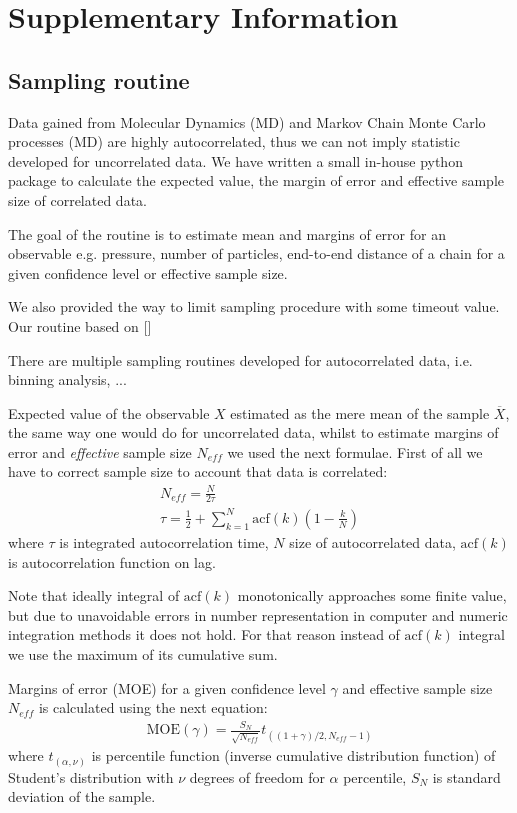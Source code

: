 \newpage
\section*{Supplementary Information}
\subsection{Sampling routine}
Data gained from Molecular Dynamics (MD) and Markov Chain Monte Carlo processes (MD) are highly autocorrelated, thus we can not imply statistic developed for uncorrelated data. We have written a small in-house python package to calculate the expected value, the margin of error and effective sample size of correlated data.

The goal of the routine is to estimate mean and margins of error for an observable e.g. pressure, number of particles, end-to-end distance of a chain for a given confidence level or effective sample size. 

We also provided the way to limit sampling procedure with some timeout value. Our routine based on [] %

There are multiple sampling routines developed for autocorrelated data, i.e. binning analysis, ... %

Expected value of the observable $X$ estimated as the mere mean of the sample $\overline{X}$, the same way one would do for uncorrelated data, whilst to estimate margins of error and \emph{effective} sample size $N_{eff}$ we used the next formulae. 
First of all we have to correct sample size to account that data is correlated:
\begin{eqnarray}
    N_{eff} = \frac{N}{2\tau}
    \\
    \tau  = \frac{1}{2} + \sum_{k=1}^{N} \text{acf} (k) (1-\frac{k}{N})
\end{eqnarray}
where $\tau$ is integrated autocorrelation time, $N$ size of autocorrelated data, $\text{acf} (k)$ is autocorrelation function on lag.

Note that ideally integral of  $\text{acf} (k)$ monotonically approaches some finite value, but due to unavoidable errors in number representation in computer and numeric integration methods it does not hold. 
For that reason instead of $\text{acf} (k)$ integral we use the maximum of its cumulative sum.

Margins of error (MOE) for a given confidence level $\gamma$ and effective sample size $N_{eff}$ is calculated using the next equation:
\begin{eqnarray}
    \text{MOE}(\gamma) = \frac{S_{N}}{\sqrt{N_{eff}}} t_{((1+\gamma)/2, N_{eff}-1)}
\end{eqnarray}
where $t_{(\alpha, \nu)}$ is percentile function (inverse cumulative distribution function) of Student’s distribution with $\nu$ degrees of freedom for $\alpha$ percentile,
$S_N$ is standard deviation of the sample.

